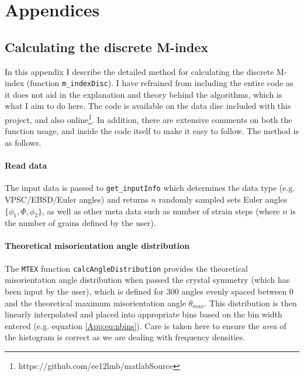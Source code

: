 \documentclass[a4paper,12pt,twoside]{report}
\numberwithin{equation}{chapter}
\begin{document}




\newpage
\appendix
\renewcommand{\thesection}{\Roman{section}}
\chapter{Appendices}

\section{Calculating the discrete M-index} \label{App:M-index_calc}
In this appendix I describe the detailed method for calculating the discrete M-index (function \texttt{m\_indexDisc}). I have refrained from including the entire code as it does not aid in the explanation and theory behind the algorithms, which is what I aim to do here. The code is available on the data disc included with this project, and also online\footnote{https://github.com/ee12lmb/matlabSource}. In addition, there are extensive comments on both the function usage, and inside the code itself to make it easy to follow. The method is as follows. 

\subsubsection{Read data}
The input data is passed to \texttt{get\_inputInfo} which determines the data type (e.g. VPSC/EBSD/Euler angles) and returns $n$ randomly sampled sets Euler angles $\{\phi_1,\Phi,\phi_2\}$, as well as other meta data such as number of strain steps (where $n$ is the number of grains defined by the user).



\subsubsection{Theoretical misorientation angle distribution}
The \texttt{MTEX} function \texttt{calcAngleDistribution} provides the theoretical misorientation angle distribution when passed the crystal symmetry (which has been input by the user), which is defined for 300 angles evenly spaced between 0 and the theoretical maximum misorientation angle $\theta_{max}$. This distribution is then linearly interpolated and placed into appropriate bins based on the bin width entered (e.g. equation \ref{App:eq:nbins}). Care is taken here to ensure the \emph{area} of the histogram is correct as we are dealing with frequency densities.
\end{document}

